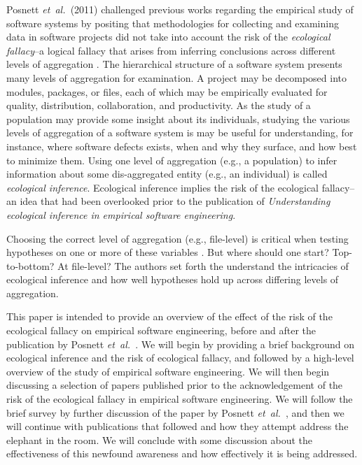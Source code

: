 \documentclass{sig-alternate-05-2015}
\newcommand{\etal}{\mbox{\emph{et al.\ }}}
\begin{document}
Posnett \etal (2011) challenged previous works regarding the empirical study of software systems by positing that methodologies for collecting and examining data in software projects did not take into account the risk of the \emph{ecological fallacy}--a logical fallacy that arises from inferring conclusions across different levels of aggregation \cite{Posnett:2011}. The hierarchical structure of a software system presents many levels of aggregation for examination.  A project may be decomposed into modules, packages, or files, each of which may be empirically evaluated for quality, distribution, collaboration, and productivity.  As the study of a population may provide some insight about its individuals, studying the various levels of aggregation of a software system is may be useful for understanding, for instance, where software defects exists, when and why they surface, and how best to minimize them.  Using one level of aggregation (e.g., a population) to infer information about some dis-aggregated entity (e.g., an individual) is called \emph{ecological inference}.  Ecological inference implies the risk of the ecological fallacy--an idea that had been overlooked prior to the publication of \emph{Understanding ecological inference in empirical software engineering}.

Choosing the correct level of aggregation (e.g., file-level) is critical when testing hypotheses on one or more of these variables \cite{Posnett:2011}.  But where should one start? Top-to-bottom? At file-level?  The authors set forth the understand the intricacies of ecological inference and how well hypotheses hold up across differing levels of aggregation.

This paper is intended to provide an overview of the effect of the risk of the ecological fallacy on empirical software engineering, before and after the publication by Posnett \etal.   We will begin by providing a brief background on ecological inference and the risk of ecological fallacy, and followed by a high-level overview of the study of empirical software engineering.  We will then begin discussing a selection of papers published prior to the acknowledgement of the risk of the ecological fallacy in empirical software engineering. We will follow the brief survey by further discussion of the paper by Posnett \etal, and then we will continue with publications that followed and how they attempt address the elephant in the room.  We will conclude with some discussion about the effectiveness of this newfound awareness and how effectively it is being addressed.
\end{document}
